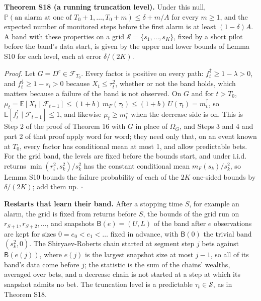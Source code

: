 \documentclass[
]{article}
\begin{document}
\textbf{Theorem S18 (a running truncation level).} Under this null,
\(\mathbb{P}(\text{an alarm at one of } T_0 + 1, \dots, T_0 + m) \le \delta + m/A\)
for every \(m \ge 1\), and the expected number of monitored steps before
the first alarm is at least \((1 - \delta)A\). A band with these
properties on a grid \(\mathcal{S} = \lbrace s_1, \dots, s_K\rbrace\),
fixed by a short pilot before the band's data start, is given by the
upper and lower bounds of Lemma S10 for each level, each at error
\(\delta/(2K)\).

\emph{Proof.} Let \(G = D^c \in \mathcal{F}_{T_0}\). Every factor is
positive on every path: \(f_t^{\uparrow} \ge 1 - \lambda > 0\), and
\(f_t^{\downarrow} \ge 1 - s_l > 0\) because \(X_t \le \tau_t^2\),
whether or not the band holds, which matters because a failure of the
band is not observed. On \(G\) and for \(t > T_0\),
\(\mu_t = \mathbb{E}[X_t \mid \mathcal{F}_{t-1}] \le (1 + b)\,m_F(\tau_t) \le (1 + b)\,U(\tau_t) = m_t^{\uparrow}\),
so \(\mathbb{E}[f_t^{\uparrow} \mid \mathcal{F}_{t-1}] \le 1\), and
likewise \(\mu_t \ge m_t^{\downarrow}\) when the decrease side is on.
This is Step 2 of the proof of Theorem 16 with \(G\) in place of
\(\Omega_G\), and Steps 3 and 4 and part 2 of that proof apply word for
word; they need only that, on an event known at \(T_0\), every factor
has conditional mean at most 1, and allow predictable bets. For the grid
band, the levels are fixed before the bounds start, and under i.i.d.
returns \(\min(r_i^2, s_k^2)/s_k^2\) has the constant conditional mean
\(m_F(s_k)/s_k^2\), so Lemma S10 bounds the failure probability of each
of the \(2K\) one-sided bounds by \(\delta/(2K)\); add them up.
\(\square\)

\textbf{Restarts that learn their band.} After a stopping time \(S\),
for example an alarm, the grid is fixed from returns before \(S\), the
bounds of the grid run on \(r_{S+1}, r_{S+2}, \dots\), and snapshots
\(\mathsf{B}(e) = (U, L)\) of the band after \(e\) observations are kept
for sizes \(0 = e_0 < e_1 < \dots\) fixed in advance, with
\(\mathsf{B}(0)\) the trivial band \((s_k^2, 0)\). The Shiryaev-Roberts
chain started at segment step \(j\) bets against \(\mathsf{B}(e(j))\),
where \(e(j)\) is the largest snapshot size at most \(j - 1\), so all of
its band's data come before \(j\); the statistic is the sum of the
chains' wealths, averaged over bets, and a decrease chain is not started
at a step at which its snapshot admits no bet. The truncation level is a
predictable \(\tau_t \in \mathcal{S}\), as in Theorem S18.
\end{document}
